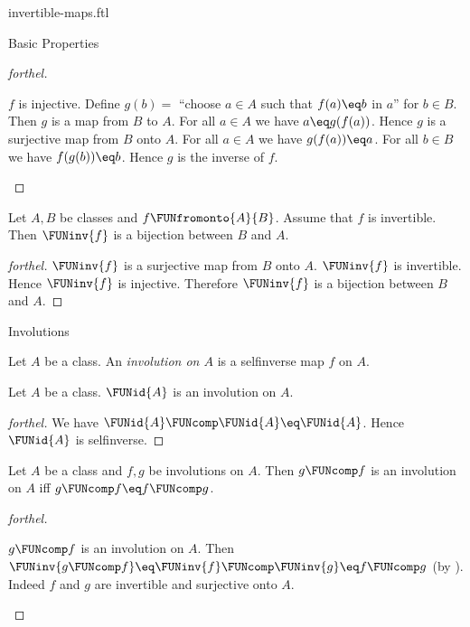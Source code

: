 \documentclass{naproche-library}
\begin{document}
\begin{smodule}[title=Invertible Maps]{invertible-maps.ftl}
\begin{sfragment}{Basic Properties}
\begin{proof}[forthel]
    \begin{case}{$f$ is injective.}
      Define $g(b) =$ ``choose $a \in A$ such that $f(a) \eq b$ in $a$'' for
      $b \in B$.
      Then $g$ is a map from $B$ to $A$.
      For all $a \in A$ we have $a \eq g(f(a))$.
      Hence $g$ is a surjective map from $B$ onto $A$.
      For all $a \in A$ we have $g(f(a)) \eq a$.
      For all $b \in B$ we have $f(g(b)) \eq b$.
      Hence $g$ is the inverse of $f$.
    \end{case}
  \end{proof}

  \begin{corollary}[forthel,id=FOUNDATIONS_09_5708971514003456]
    Let $A, B$ be classes and $f \FUNfromonto{A}{B}$.
    Assume that $f$ is invertible.
    Then $\FUNinv{f}$ is a bijection between $B$ and $A$.
  \end{corollary}
  \begin{proof}[forthel]
    $\FUNinv{f}$ is a surjective map from $B$ onto $A$.
    $\FUNinv{f}$ is invertible.
    Hence $\FUNinv{f}$ is injective.
    Therefore $\FUNinv{f}$ is a bijection between $B$ and $A$.
  \end{proof}
\end{sfragment}

\begin{sfragment}{Involutions}

  \begin{definition}[forthel,id=FOUNDATIONS_09_7282039688527872]
    Let $A$ be a class.
    An \emph{involution on $A$} is a selfinverse map $f$ on $A$.
  \end{definition}

  \begin{proposition}[forthel,id=FOUNDATIONS_09_7944474185433088]
    Let $A$ be a class.
    $\FUNid{A}$ is an involution on $A$.
  \end{proposition}
  \begin{proof}[forthel]
    We have $\FUNid{A} \FUNcomp \FUNid{A} \eq \FUNid{A}$.
    Hence $\FUNid{A}$ is selfinverse.
  \end{proof}

  \begin{proposition}[forthel,id=FOUNDATIONS_09_6897019612299264]
    Let $A$ be a class and $f, g$ be involutions on $A$.
    Then $g \FUNcomp f$ is an involution on $A$ iff $g \FUNcomp f \eq f \FUNcomp g$.
  \end{proposition}
  \begin{proof}[forthel]
    \begin{case}{$g \FUNcomp f$ is an involution on $A$.}
      Then $\FUNinv{g \FUNcomp f}
        \eq \FUNinv{f} \FUNcomp \FUNinv{g}
        \eq f \FUNcomp g$
      (by ).
      Indeed $f$ and $g$ are invertible and surjective onto $A$.
    \end{case}


\end{proof}
\end{sfragment}
\end{smodule}
\end{document}
